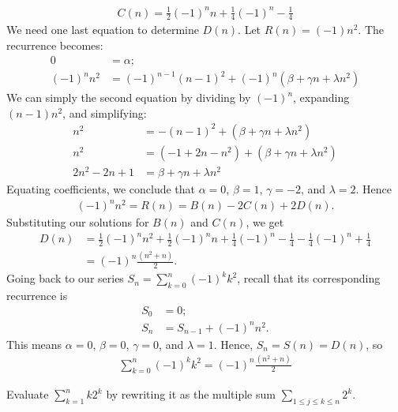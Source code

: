\documentclass[12pt]{article}
\newenvironment{ex}[2][Exercise]{\begin{trivlist}
		\item[\hskip \labelsep {\bfseries #1}\hskip \labelsep {\bfseries #2.}]}{\end{trivlist}}
\newenvironment{sol}[1][Solution]{\begin{trivlist}
		\item[\hskip \labelsep {\bfseries #1:}]}{\end{trivlist}}
\begin{document}
\begin{sol}
\begin{align*}
		C(n)=\frac{1}{2}(-1)^n n + \frac{1}{4}(-1)^n-\frac{1}{4}
	\end{align*}
	We need one last equation to determine $D(n)$. Let $R(n)=(-1)n^2$. The recurrence becomes:
	\begin{align*}
		0&=\alpha;\\
		(-1)^nn^2&=(-1)^{n-1}(n-1)^2+(-1)^n(\beta+\gamma n+ \lambda n^2)
	\end{align*}
	We can simply the second equation by dividing by $(-1)^n$, expanding $(n-1)n^2$,
	and simplifying:
	\begin{align*}
		n^2&=-(n-1)^2+(\beta +\gamma n + \lambda n^2)\\
		n^2&=(-1+2n-n^2)+(\beta +\gamma n + \lambda n^2)\\
		2n^2-2n+1&=\beta+\gamma n + \lambda n^2
	\end{align*}
	Equating coefficients, we conclude that $\alpha=0$, $\beta=1$, $\gamma = -2$, and
	$\lambda = 2$. Hence
	\begin{align*}
		(-1)^nn^2=R(n)=B(n)-2C(n)+2D(n).
	\end{align*}
	Substituting our solutions for $B(n)$ and $C(n)$, we get
	\begin{align*}
		D(n)&=\frac{1}{2}(-1)^n n^2 + \frac{1}{2}(-1)^n n + \frac{1}{4}(-1)^n - \frac{1}{4}
		-\frac{1}{4}(-1)^n + \frac{1}{4}\\
		&=(-1)^n\frac{(n^2 + n)}{2}.
	\end{align*}
	Going back to our series $S_n=\sum_{k=0}^{n}(-1)^k k^2$, recall that its corresponding
	recurrence is
	\begin{align*}
		S_0&=0;\\
		S_n&=S_{n-1}+(-1)^nn^2.
	\end{align*}
	This means $\alpha=0$, $\beta=0$, $\gamma=0$, and $\lambda=1$. Hence, $S_n=S(n)=D(n)$, so
	\begin{align*}
		\sum_{k=0}^{n}(-1)^k k^2
		=(-1)^n\frac{(n^2 + n)}{2}
	\end{align*}
\end{sol}

\begin{ex}{14}
	Evaluate $\sum_{k=1}^{n} k 2^k$ by rewriting it as the multiple sum
	$\sum_{1\leq j \leq k \leq n} 2^k$.
\end{ex}
\end{document}
